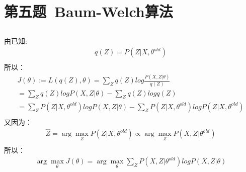 \documentclass[12pt,a4paper]{article}
\begin{document}
\section{第五题\ Baum-Welch算法}
\subsection{}
由已知:
\begin{gather*}
    q(Z) = P(Z|X,\theta^{old})\\
\end{gather*}
所以：
\begin{gather*}
    J(\theta) := L(q(Z),\theta) = \sum_{Z}q(Z)log\frac{P(X,Z|\theta)}{q(Z)}\\
    =\sum_{Z}q(Z)logP(X,Z|\theta)-\sum_{Z}q(Z)logq(Z)\\
    =\sum_{Z}P(Z|X,\theta^{old})logP(X,Z|\theta)-\sum_{Z}P(Z|X,\theta^{old})logP(Z|X,\theta^{old})\\
\end{gather*}
又因为：
\begin{gather*}
    \hat{Z} = \arg\max_{Z}P(Z|X,\theta^{old}) \propto \arg\max_{Z}P(X,Z|\theta^{old})\\
\end{gather*}
所以：
\begin{gather*}
    \arg\max_{\theta}J(\theta) = \arg\max_{\theta}\sum_{Z}P(X,Z|\theta^{old})logP(X,Z|\theta)\\
\end{gather*}
\end{document}
